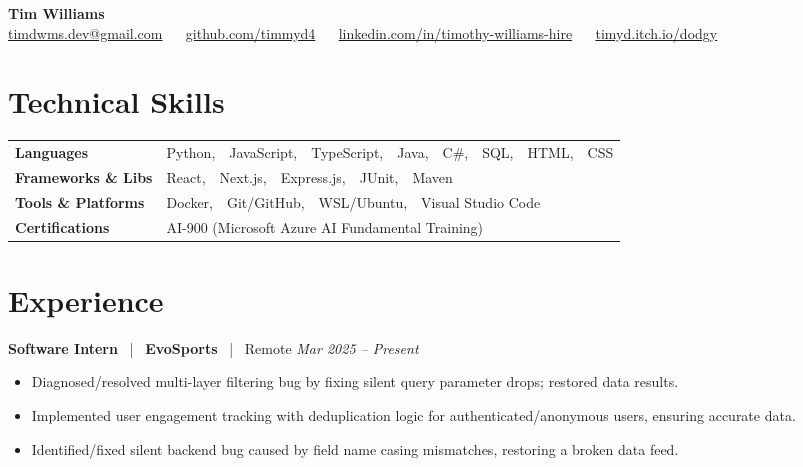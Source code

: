 \documentclass[10pt, letterpaper]{article}
\newcommand{\jobhead}[4]{%
  \vspace{5pt}%
  {\bfseries\color{dark}#1}%
  ~{\color{light}|}~%
  {\bfseries\color{navy}#2}%
  ~{\color{light}|}~%
  {\color{light}#3}%
  \hfill{\color{light}\small\textit{#4}}\\[-2pt]%
}
\newcommand{\skillrow}[2]{%
  {\bfseries #1} & #2 \\[2pt]%
}
\begin{document}

\begin{center}
  {\huge\bfseries\color{navy} Tim Williams}\\[4pt]
  {\small\color{light}
    \href{mailto:timdwms.dev@gmail.com}{timdwms.dev@gmail.com}
    ~\textbullet~
    \href{https://github.com/timmyd4}{github.com/timmyd4}
    ~\textbullet~
    \href{https://www.linkedin.com/in/timothy-williams-hire}{linkedin.com/in/timothy-williams-hire}
    ~\textbullet~
    \href{https://timyd.itch.io/dodgy}{timyd.itch.io/dodgy}
  }
\end{center}

\vspace{2pt}

\section{Technical Skills}

\begin{tabular}{@{}p{1.6in} p{5.2in}@{}}
  \skillrow{Languages}{Python,\ \ JavaScript,\ \ TypeScript,\ \ Java,\ \ C\#,\ \ SQL,\ \ HTML,\ \ CSS}
  \skillrow{Frameworks \& Libs}{React,\ \ Next.js,\ \ Express.js,\ \ JUnit,\ \ Maven}
  \skillrow{Tools \& Platforms}{Docker,\ \ Git/GitHub,\ \ WSL/Ubuntu,\ \ Visual Studio Code}
  \skillrow{Certifications}{AI-900 (Microsoft Azure AI Fundamental Training)}
\end{tabular}

\section{Experience}

\jobhead{Software Intern}{EvoSports}{Remote}{Mar 2025 – Present}
\begin{itemize}
  \item Diagnosed/resolved multi-layer filtering bug by fixing silent query parameter drops; restored data results.
  \item Implemented user engagement tracking with deduplication logic for authenticated/anonymous users, ensuring accurate data.
  \item Identified/fixed silent backend bug caused by field name casing mismatches, restoring a broken data feed.
\end{itemize}
\end{document}
